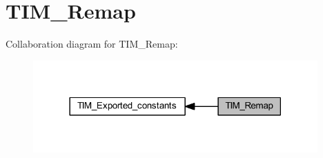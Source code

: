 \hypertarget{group___t_i_m___remap}{}\section{T\+I\+M\+\_\+\+Remap}
\label{group___t_i_m___remap}
Collaboration diagram for T\+I\+M\+\_\+\+Remap\+:\nopagebreak
\begin{figure}[H]
\begin{center}
\leavevmode
\includegraphics[width=309pt]{group___t_i_m___remap}
\end{center}
\end{figure}
